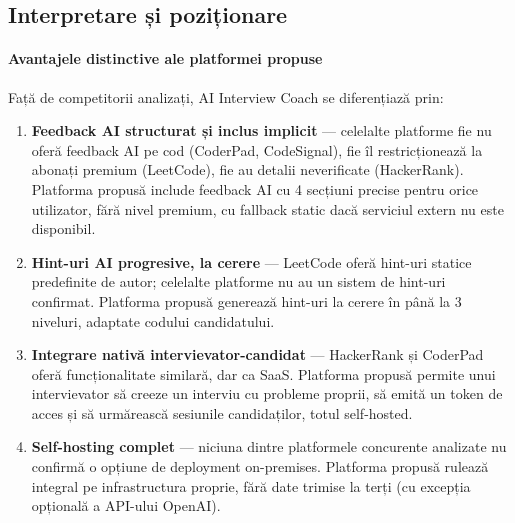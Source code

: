 \subsection{Interpretare și poziționare}

\paragraph{Avantajele distinctive ale platformei propuse}
Față de competitorii analizați, AI Interview Coach se diferențiază prin:

\begin{enumerate}
  \item \textbf{Feedback AI structurat și inclus implicit} — celelalte
        platforme fie nu oferă feedback AI pe cod (CoderPad, CodeSignal),
        fie îl restricționează la abonați premium (LeetCode), fie au
        detalii neverificate (HackerRank). Platforma propusă include
        feedback AI cu 4 secțiuni precise pentru orice utilizator, fără
        nivel premium, cu fallback static dacă serviciul extern nu este
        disponibil.

  \item \textbf{Hint-uri AI progresive, la cerere} — LeetCode oferă
        hint-uri statice predefinite de autor; celelalte platforme nu au
        un sistem de hint-uri confirmat. Platforma propusă generează
        hint-uri la cerere în până la 3 niveluri, adaptate codului
        candidatului.

  \item \textbf{Integrare nativă intervievator-candidat} — HackerRank și
        CoderPad oferă funcționalitate similară, dar ca SaaS. Platforma
        propusă permite unui intervievator să creeze un interviu cu
        probleme proprii, să emită un token de acces și să urmărească
        sesiunile candidaților, totul self-hosted.

  \item \textbf{Self-hosting complet} — niciuna dintre platformele
        concurente analizate nu confirmă o opțiune de deployment
        on-premises. Platforma propusă rulează integral pe infrastructura
        proprie, fără date trimise la terți (cu excepția opțională a API-ului
        OpenAI).
\end{enumerate}

